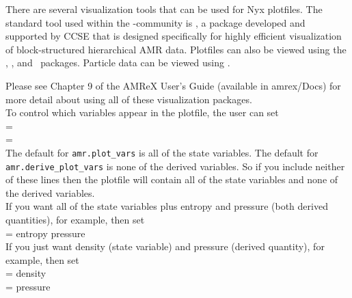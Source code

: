 There are several visualization tools that can be used for Nyx
plotfiles.  The standard tool used within the
\amrex-community is \amrvis, a package developed and supported
by CCSE that is designed specifically for highly efficient visualization
of block-structured hierarchical AMR data.
Plotfiles can also be viewed using the \visit, \paraview, and \yt\ packages.
Particle data can be viewed using \paraview.

Please see Chapter 9 of the AMReX User's Guide (available in amrex/Docs)
for more detail about using all of these visualization packages. \\

\noindent To control which variables appear in the plotfile, the user can set \\

 = \\
 = \\

\noindent The default for {\tt amr.plot\_vars}
is all of the state variables.  The default for {\tt amr.derive\_plot\_vars} is none of
the derived variables.  So if you include neither of these lines then the plotfile
will contain all of the state variables and none of the derived variables. \\

\noindent If you want all of the state variables plus entropy and pressure (both derived quantities), for example, then set \\

 = entropy pressure \\

\noindent If you just want density (state variable) and pressure (derived quantity), for example, then set \\

 =  density \\

 = pressure \\

